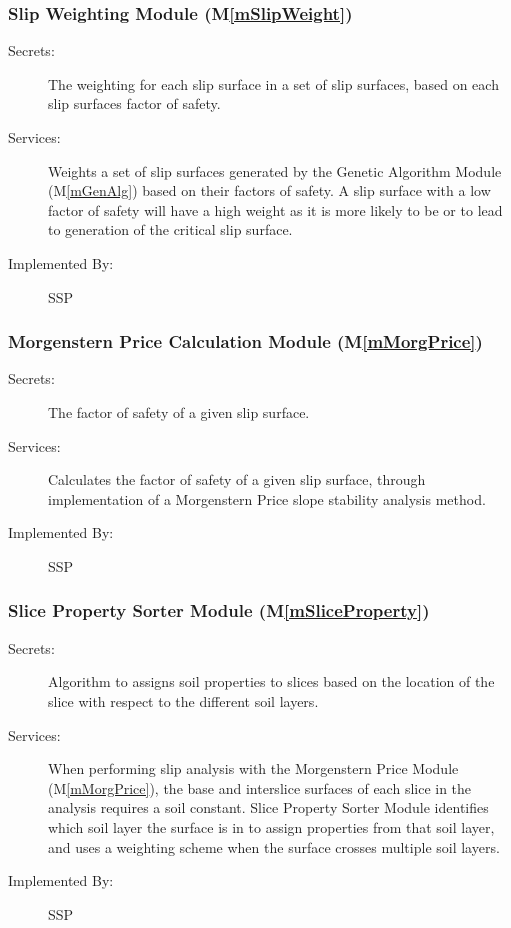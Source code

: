 \documentclass[12pt, titlepage]{article}
\newcommand{\progname}{SSP}
\newcommand{\mref}[1]{M\ref{#1}}
\begin{document}
\subsubsection{Slip Weighting Module (\mref{mSlipWeight})}

\begin{description}
\item[Secrets:] The weighting for each slip surface in a set of slip
  surfaces, based on each slip surfaces factor of safety.
\item[Services:] Weights a set of slip surfaces generated by the
  Genetic Algorithm Module (\mref{mGenAlg}) based on their factors of
  safety. A slip surface with a low factor of safety will have a high
  weight as it is more likely to be or to lead to generation of the
  critical slip surface.
\item[Implemented By:] \progname
\end{description} 

\subsubsection{Morgenstern Price Calculation Module (\mref{mMorgPrice})}

\begin{description}
\item[Secrets:] The factor of safety of a given slip surface.
\item[Services:] Calculates the factor of safety of a given slip
  surface, through implementation of a Morgenstern Price slope
  stability analysis method.
\item[Implemented By:] \progname
\end{description} 

\subsubsection{Slice Property Sorter Module (\mref{mSliceProperty})}
\begin{description}
\item[Secrets:] Algorithm to assigns soil properties to slices based
  on the location of the slice with respect to the different soil
  layers.
\item[Services:] When performing slip analysis with the Morgenstern Price Module
  (\mref{mMorgPrice}), the base and interslice surfaces of each slice
  in the analysis requires a soil constant. Slice Property Sorter
  Module identifies which soil layer the surface is in to assign
  properties from that soil layer, and uses a weighting scheme when
  the surface crosses multiple soil layers.
\item[Implemented By:] \progname
\end{description} 
\end{document}
